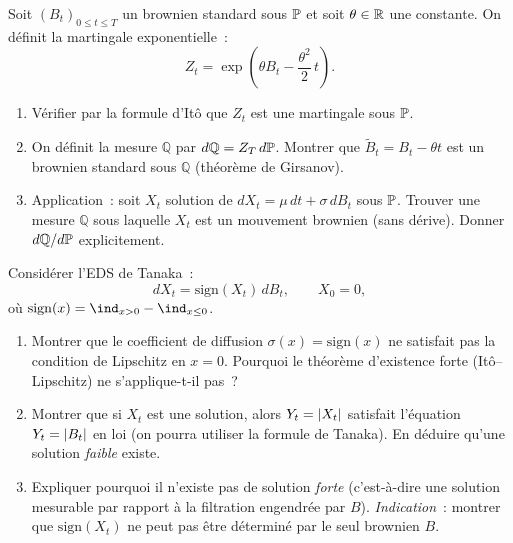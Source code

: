 \begin{exercice}
Soit $(B_t)_{0 \leq t \leq T}$ un brownien standard sous $\mathbb{P}$ et
soit $\theta \in \mathbb{R}$ une constante. On d\'efinit la martingale
exponentielle~:
\[
  Z_t = \exp\!\left(\theta B_t - \frac{\theta^2}{2}\,t\right).
\]
\begin{enumerate}
  \item V\'erifier par la formule d'It\^o que $Z_t$ est une martingale
        sous $\mathbb{P}$.
  \item On d\'efinit la mesure $\mathbb{Q}$ par $d\mathbb{Q} = Z_T\,d\mathbb{P}$.
        Montrer que $\widetilde{B}_t = B_t - \theta t$ est un brownien
        standard sous $\mathbb{Q}$ (th\'eor\`eme de Girsanov).
  \item Application~: soit $X_t$ solution de
        $dX_t = \mu\,dt + \sigma\,dB_t$ sous $\mathbb{P}$. Trouver une mesure
        $\mathbb{Q}$ sous laquelle $X_t$ est un mouvement brownien
        (sans d\'erive). Donner $d\mathbb{Q}/d\mathbb{P}$ explicitement.
\end{enumerate}
\end{exercice}

\begin{exercice}
Consid\'erer l'EDS de Tanaka~:
\[
  dX_t = \mathrm{sign}(X_t)\,dB_t, \qquad X_0 = 0,
\]
o\`u $\mathrm{sign}(x) = \ind_{x > 0} - \ind_{x \leq 0}$.
\begin{enumerate}
  \item Montrer que le coefficient de diffusion $\sigma(x) = \mathrm{sign}(x)$
        ne satisfait pas la condition de Lipschitz en $x = 0$. Pourquoi
        le th\'eor\`eme d'existence forte (It\^o--Lipschitz) ne s'applique-t-il pas~?
  \item Montrer que si $X_t$ est une solution, alors $Y_t = \left| X_t \right|$
        satisfait l'\'equation $Y_t = \left| B_t \right|$ en loi (on pourra
        utiliser la formule de Tanaka). En d\'eduire qu'une solution
        \emph{faible} existe.
  \item Expliquer pourquoi il n'existe pas de solution \emph{forte}
        (c'est-\`a-dire une solution mesurable par rapport \`a la filtration
        engendr\'ee par $B$). \emph{Indication}~: montrer que
        $\mathrm{sign}(X_t)$ ne peut pas \^etre d\'etermin\'e par le seul
        brownien $B$.
\end{enumerate}
\end{exercice}
